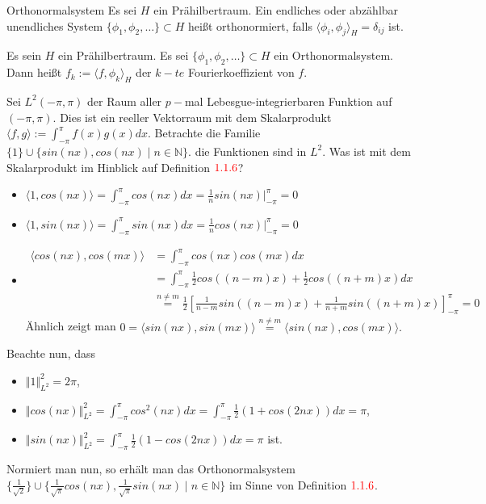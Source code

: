 \documentclass[12pt,titlepage]{article}
\begin{document}
\begin{definition}{Orthonormalsystem}
Es sei $H$ ein Prähilbertraum. Ein endliches oder abzählbar unendliches System $\{\phi_1,\phi_2,\ldots\}\subset H$ heißt orthonormiert, falls $\langle \phi_i,\phi_j \rangle_H= \delta_{ij}$ ist.
\end{definition}
\begin{definition}
Es sein $H$ ein Prähilbertraum. Es sei $\{\phi_1,\phi_2,\ldots\}\subset H$ ein Orthonormalsystem. Dann heißt $f_k:=\langle f, \phi_k\rangle_H$ der $k-te$ Fourierkoeffizient von $f$.
\end{definition}
 \begin{bsp}
 Sei $L^2(-\pi, \pi)$ der Raum aller $p-$mal Lebesgue-integrierbaren Funktion auf $(-\pi,\pi)$. Dies ist ein reeller Vektorraum mit dem Skalarprodukt $\langle f, g\rangle:=\int_{-\pi}^\pi f(x)g(x)dx$. Betrachte die Familie
 $\{1\} \cup \{sin(nx),cos(nx)\mid n \in \mathbb{N}\}$. die Funktionen sind in $L^2$. Was ist mit dem Skalarprodukt im Hinblick auf Definition $\textcolor{red}{1.1.6}$?
 \begin{itemize}
 \item $\langle 1,cos(nx) \rangle=\int_{-\pi}^\pi cos(nx)dx=\frac{1}{n}sin(nx)|_{-\pi}^\pi=0$
 \item $\langle 1,sin(nx) \rangle=\int_{-\pi}^\pi sin(nx)dx=\frac{1}{n}cos(nx)|_{-\pi}^\pi=0$
 \item \begin{align*}
 \langle cos(nx),cos(mx) \rangle&=\int_{-\pi}^\pi cos(nx)cos(mx)dx\\
 &=\int_{-\pi}^\pi\frac{1}{2}cos((n-m)x)+\frac{1}{2}cos((n+m)x)dx\\
& \overset{n \neq m}{=} \frac{1}{2}[\frac{1}{n-m}sin((n-m)x)+\frac{1}{n+m}sin((n+m)x)]_{-\pi}^\pi=0
 \end{align*}
 Ähnlich zeigt man $0=\langle sin(nx), sin(mx)\rangle \overset{n\neq m }{=} \langle sin(nx),cos(mx)\rangle.$
 \end{itemize}
 Beachte nun, dass
 \begin{itemize}
\item $\Vert 1 \Vert_{L^2}^2=2\pi $,
 \item $\Vert cos(nx) \Vert_{L^2}^2=\int_{-\pi}^\pi cos^2(nx)dx=\int_{-\pi}^\pi \frac{1}{2}(1+cos(2nx))dx =\pi$,
 \item  $\Vert sin(nx) \Vert_{L^2}^2=\int_{-\pi}^\pi \frac{1}{2}(1-cos(2nx))dx =\pi$ ist.
 \end{itemize} 
 Normiert man nun, so erhält man das Orthonormalsystem $\{\frac{1}{\sqrt{2}}\}\cup \{\frac{1}{\sqrt{\pi}}cos(nx),\frac{1}{\sqrt{\pi}}sin(nx)\mid n \in \mathbb{N}\}$ im Sinne von Definition $\textcolor{red}{1.1.6}$.
 \end{bsp}
\end{document}
